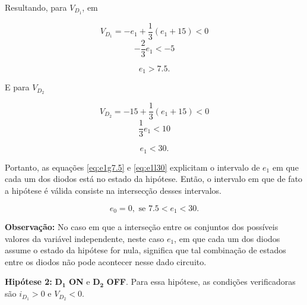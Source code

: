 \documentclass{article}
\numberwithin{equation}{section}
\newcommand{\itembull}[1]{\noindent\textbf{\small{\textbullet \hspace{1.5mm}#1}}}
\begin{document}
\noindent Resultando, para $V_{D_1}$, em

\begin{equation*}
    V_{D_{1}} = -e_1 + \frac{1}{3}(e_{1}+15)<0
\end{equation*}
\begin{equation*}
    - \frac{2}{3}e_1<-5
\end{equation*}

\begin{equation}
\label{eq:e1g7.5}
    e_1>7.5.
\end{equation}

\noindent E para $V_{D_2}$

\begin{equation*}
    V_{D_2} = -15 + \frac{1}{3}(e_1+15)<0
\end{equation*}
\begin{equation*}
    \frac{1}{3}e_1<10
\end{equation*}

\begin{equation}
\label{eq:e1l30}
    e_1<30.
\end{equation}

\vspace{2mm}

\noindent Portanto, as equações \eqref{eq:e1g7.5} e \eqref{eq:e1l30} explicitam o intervalo de $e_1$ em que cada um dos diodos está no estado da hipótese. Então, o intervalo em que de fato a hipótese é válida consiste na intersecção desses intervalos.

\begin{equation}
\label{eq:h1}
    e_0 = 0, \text{ se }  7.5<e_1<30.
\end{equation}

\textbf{Observação:} No caso em que a interseção entre os conjuntos dos possíveis valores da variável independente, neste caso $e_1$, em que cada um dos diodos assume o estado da hipótese for nula, significa que tal combinação de estados entre os diodos não pode acontecer nesse dado circuito.

\vspace{5mm}

\itembull{Hipótese 2:} $\mathbf{D_1}$ \textbf{ON} e $\mathbf{D_2}$ \textbf{OFF}. Para essa hipótese, as condições verificadoras são $i_{D_1}>0$ e $V_{D_2}<0$.
\end{document}
